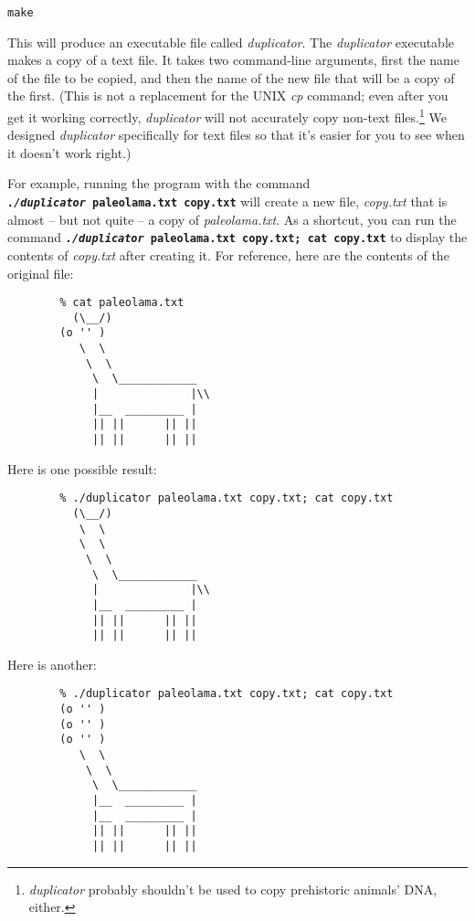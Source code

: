     \texttt{make}

    This will produce an executable file called \textit{duplicator}.
    The \textit{duplicator} executable makes a copy of a text file.
    It takes two command-line arguments, first the name of the file to be copied, and then the name of the new file that will be a copy of the first.
    (This is not a replacement for the UNIX \textit{cp} command;
    even after you get it working correctly, \textit{duplicator} will not accurately copy non-text files.\footnote{\textit{duplicator} probably shouldn't be used to copy prehistoric animals' DNA, either.}
    We designed \textit{duplicator} specifically for text files so that it's easier for you to see when it doesn't work right.)

    For example, running the program with the command \texttt{\textbf{\textit{./duplicator}~paleolama.txt~copy.txt}} will create a new file, \textit{copy.txt} that is almost -- but not quite -- a copy of \textit{paleolama.txt}.
    As a shortcut, you can run the command \texttt{\textbf{\textit{./duplicator}~paleolama.txt~copy.txt;~cat~copy.txt}} to display the contents of \textit{copy.txt} after creating it.
    For reference, here are the contents of the original file:
\newpage
    \begin{verbatim}
        % cat paleolama.txt
          (\__/)
        (o '' )
           \  \
            \  \
             \  \____________
             |              |\\
             |__  _________ |
             || ||      || ||
             || ||      || ||
    \end{verbatim}

    Here is one possible result:

    \begin{verbatim}
        % ./duplicator paleolama.txt copy.txt; cat copy.txt
          (\__/)
           \  \
           \  \
            \  \
             \  \____________
             |              |\\
             |__  _________ |
             || ||      || ||
             || ||      || ||
    \end{verbatim}

    Here is another:

    \begin{verbatim}
        % ./duplicator paleolama.txt copy.txt; cat copy.txt
        (o '' )
        (o '' )
        (o '' )
           \  \
            \  \
             \  \____________
             |__  _________ |
             |__  _________ |
             || ||      || ||
             || ||      || ||
    \end{verbatim}

